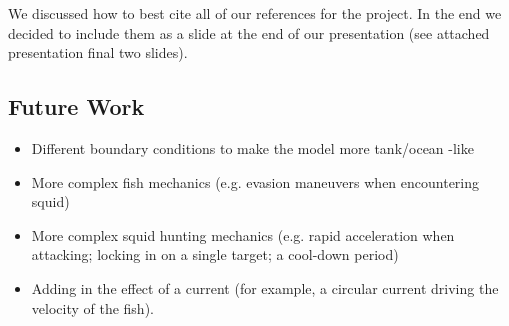 \documentclass[12pt]{article}
\begin{document}
We discussed how to best cite all of our references for the project. In the end we decided to include them as a slide at the end of our presentation (see attached presentation final two slides).

\subsection{Future Work}
\begin{itemize}
    \item Different boundary conditions to make the model more tank/ocean -like
    \item More complex fish mechanics (e.g. evasion maneuvers when encountering squid)
    \item More complex squid hunting mechanics (e.g. rapid acceleration when attacking; locking in on a single target; a cool-down period)
    \item Adding in the effect of a current (for example, a circular current driving the velocity of the fish).
\end{itemize}
\end{document}
